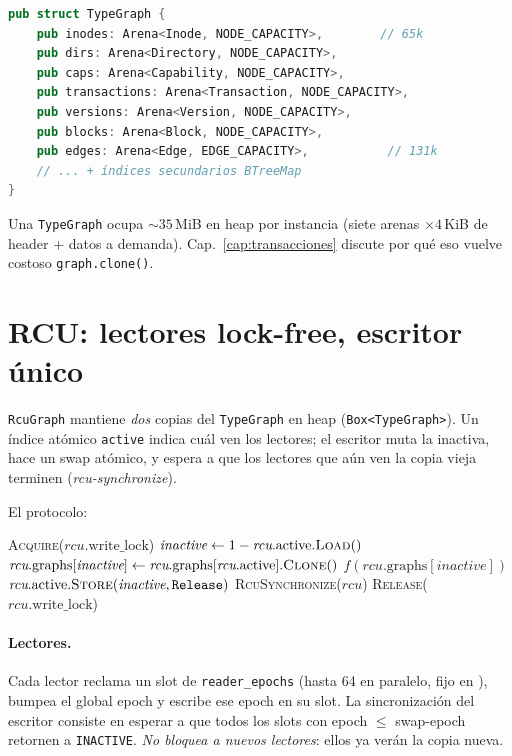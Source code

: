 \begin{lstlisting}[language=rust]
pub struct TypeGraph {
    pub inodes: Arena<Inode, NODE_CAPACITY>,        // 65k
    pub dirs: Arena<Directory, NODE_CAPACITY>,
    pub caps: Arena<Capability, NODE_CAPACITY>,
    pub transactions: Arena<Transaction, NODE_CAPACITY>,
    pub versions: Arena<Version, NODE_CAPACITY>,
    pub blocks: Arena<Block, NODE_CAPACITY>,
    pub edges: Arena<Edge, EDGE_CAPACITY>,           // 131k
    // ... + índices secundarios BTreeMap
}
\end{lstlisting}

Una \texttt{TypeGraph} ocupa $\sim 35$\,MiB en heap por instancia
(siete arenas $\times 4$\,KiB de header + datos a demanda). Cap.~\ref{cap:transacciones}
discute por qué eso vuelve costoso \texttt{graph.clone()}.

\section{RCU: lectores lock-free, escritor único}

\begin{defn}[RcuGraph]
\label{def:rcu-graph}
\texttt{RcuGraph} mantiene \emph{dos} copias del \texttt{TypeGraph} en
heap (\texttt{Box<TypeGraph>}). Un índice atómico \texttt{active}
indica cuál ven los lectores; el escritor muta la inactiva, hace un
swap atómico, y espera a que los lectores que aún ven la copia vieja
terminen (\emph{rcu-synchronize}).
\end{defn}

El protocolo:

\begin{algorithm}[H]
\SetAlgoLined
{}
\caption{\textsc{RcuGraph.Write}}\label{alg:rcu-write}

\textsc{Acquire}($\textit{rcu}.\textrm{write\_lock}$)
$\textit{inactive} \gets 1 - \textit{rcu}.\textrm{active}.\textsc{Load}()$\;
$\textit{rcu}.\textrm{graphs}[\textit{inactive}] \gets \textit{rcu}.\textrm{graphs}[\textit{rcu}.\textrm{active}].\textsc{Clone}()$\;
$f(\textit{rcu}.\textrm{graphs}[\textit{inactive}])$\;
$\textit{rcu}.\textrm{active}.\textsc{Store}(\textit{inactive}, \texttt{Release})$\;
\textsc{RcuSynchronize}($\textit{rcu}$)
\textsc{Release}($\textit{rcu}.\textrm{write\_lock}$)\;
\end{algorithm}

\paragraph{Lectores.} Cada lector reclama un slot de
\texttt{reader\_epochs} (hasta 64 en paralelo, fijo en
), bumpea el global epoch y
escribe ese epoch en su slot. La sincronización del escritor consiste
en esperar a que todos los slots con epoch $\le$ swap-epoch retornen a
\texttt{INACTIVE}. \emph{No bloquea a nuevos lectores}: ellos ya verán
la copia nueva.

